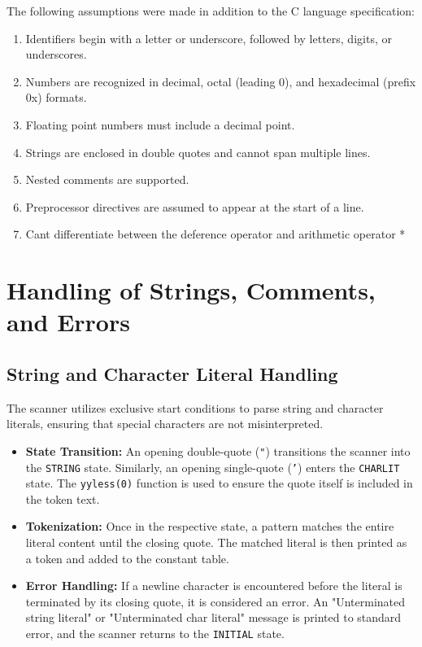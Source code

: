 \documentclass[12pt,a4paper]{article}
\begin{document}
The following assumptions were made in addition to the C language specification:
\begin{enumerate}
    \item Identifiers begin with a letter or underscore, followed by letters, digits, or underscores.
    \item Numbers are recognized in decimal, octal (leading 0), and hexadecimal (prefix 0x) formats.
    \item Floating point numbers must include a decimal point.
    \item Strings are enclosed in double quotes and cannot span multiple lines.
    \item Nested comments are supported.
    \item Preprocessor directives are assumed to appear at the start of a line.
    \item Cant differentiate between the deference operator and arithmetic operator *
\end{enumerate}

\section{Handling of Strings, Comments, and Errors}

\subsection{String and Character Literal Handling}
The scanner utilizes exclusive start conditions to parse string and character literals, ensuring that special characters are not misinterpreted.
\begin{itemize}
    \item \textbf{State Transition:} An opening double-quote (\texttt{"}) transitions the scanner into the \texttt{STRING} state. Similarly, an opening single-quote (\texttt{'}) enters the \texttt{CHARLIT} state. The \texttt{yyless(0)} function is used to ensure the quote itself is included in the token text.
    \item \textbf{Tokenization:} Once in the respective state, a pattern matches the entire literal content until the closing quote. The matched literal is then printed as a token and added to the constant table.
    \item \textbf{Error Handling:} If a newline character is encountered before the literal is terminated by its closing quote, it is considered an error. An "Unterminated string literal" or "Unterminated char literal" message is printed to standard error, and the scanner returns to the \texttt{INITIAL} state.
\end{itemize}
\end{document}
